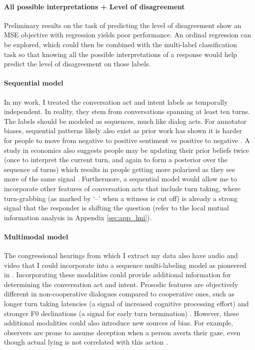 \paragraph{All possible interpretations + Level of disagreement} Preliminary results on the task of predicting the level of disagreement show an MSE objective with regression yields poor performance. An ordinal regression can be explored, which could then be combined with the multi-label classification task so that knowing all the possible interpretations of a response would help predict the level of disagreement on those labels. 

\paragraph{Sequential model}
In my work, I treated the conversation act and intent labels as temporally independent. In reality, they stem from conversations spanning at least ten turns. The labels should be modeled as sequences, much like dialog acts. For annotator biases, sequential patterns likely also exist as prior work has shown it is harder for people to move from negative to positive sentiment vs positive to negative \cite{Boydstun:2019}. A study in economics also suggests people may be updating their prior beliefs twice (once to interpret the current turn, and again to form a posterior over the sequence of turns) which results in people getting more polarized as they see more of the same signal \cite{Fryer:2019}. Furthermore, a sequential model would allow me to incorporate other features of conversation acts that include turn taking, where turn-grabbing (as marked by `--' when a witness is cut off) is already a strong signal that the responder is shifting the question (refer to the local mutual information analysis in Appendix \ref{sec:app_lmi}). 


\paragraph{Multimodal model}
The congressional hearings from which I extract my data also have audio and video that I could incorporate into a sequence multi-labeling model as pioneered in \cite{Li:2010}. Incorporating these modalities could provide additional information for determining the conversation act and intent. Prosodic features are objectively different in non-cooperative dialogues compared to cooperative ones, such as longer turn taking latencies (a signal of increased cognitive processing effort) and stronger F0 declinations (a signal for early turn termination) \cite{Reichel:2018}. However, these additional modalities could also introduce new sources of bias. For example, observers are prone to assume deception when a person averts their gaze, even though actual lying is not correlated with this action \cite{Levine:2019}.

